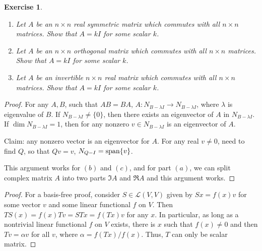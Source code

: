 \documentclass[11pt]{book}
\newtheorem{exercise}{Exercise}[section]
\theoremstyle{definition}
\numberwithin{equation}{subsection}
\begin{document}
\begin{exercise}
~\begin{enumerate}[label=(\alph*)]
    \item Let $A$ be an $n \times n$ real symmetric matrix which commutes with all $n \times n$ matrices. Show that $A = kI$ for some scalar $k$.
    
    \item Let $A$ be an $n \times n$ orthogonal matrix which commutes with all $n \times n$ matrices. Show that $A = kI$ for some scalar $k$.
    
    \item Let $A$ be an invertible $n \times n$ real matrix which commutes with all $n \times n$ matrices. Show that $A = kI$ for some scalar $k$.
\end{enumerate}
\end{exercise}
\begin{proof}
For any $A, B$, such that $AB = BA$, $A: N_{B - \lambda I} \to N_{B - \lambda I}$, where $\lambda$ is eigenvalue of $B$. If $N_{B - \lambda I} \neq \{0\}$, then there exists an eigenvector of $A$ in $N_{B - \lambda I}$. If $\dim N_{B - \lambda I} = 1$, then for any nonzero $v \in N_{B - \lambda I}$ is an eigenvector of $A$.

Claim: any nonzero vector is an eigenvector for $A$. For any real $v \neq 0$, need to find $Q$, so that $Qv = v$, $N_{Q-I} = {\rm span}\{v\}$.

This argument works for $(b)$ and $(c)$, and for part $(a)$, we can split complex matrix $A$ into two parts $\Im A$ and $\Re A$ and this argument works.
\end{proof}

\cite{23}
\begin{proof}
For a basis-free proof, consider $S \in \mathscr{L}(V, V)$ given by $Sx = f(x)v$ for some vector $v$ and some linear functional $f$ on $V$. Then $TS(x) = f(x) Tv = ST x = f(Tx) v$ for any $x$. In particular, as long as a nontrivial linear functional $f$ on $V$ exists, there is $x$ such that $f(x) \neq 0$ and then $Tv = \alpha v$ for all $v$, where $\alpha = f(Tx)/f(x)$. Thus, $T$ can only be scalar matrix.
\end{proof}
\end{document}
